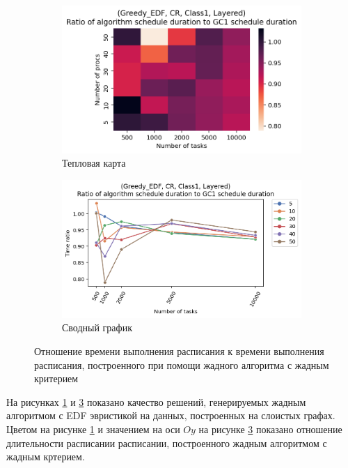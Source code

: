 \begin{figure}[!htbp]
    \centering
    \begin{subfigure}{0.49\textwidth}
        \includegraphics[width=\textwidth]{imgs/layered_class_1/CR_EDF/times.png}
        \caption{Тепловая карта}
        \label{fig:CR-layered-EDF-times-heatmap}
    \end{subfigure}
    \hfill
    \begin{subfigure}{0.49\textwidth}
        \includegraphics[width=\textwidth]{imgs/layered_class_1/CR_EDF/gr_amalgamated.png}
        \caption{Сводный график}
        \label{fig:CR-layered-EDF-times-compiled} 
    \end{subfigure}
    \caption{Отношение времени выполнения расписания к времени выполнения расписания, построенного при помощи жадного алгоритма с жадным критерием}
\end{figure}

На рисунках \ref{fig:CR-layered-EDF-times-heatmap} и \ref{fig:CR-layered-EDF-times-compiled} показано качество решений, генерируемых жадным алгоритмом с EDF эвристикой на данных, построенных на слоистых графах. Цветом на рисунке \ref{fig:CR-layered-EDF-times-heatmap} и значением на оси $Oy$ на рисунке \ref{fig:CR-layered-EDF-times-compiled} показано отношение длительности расписании расписании, построенного жадным алгоритмом с жадным кртерием.

